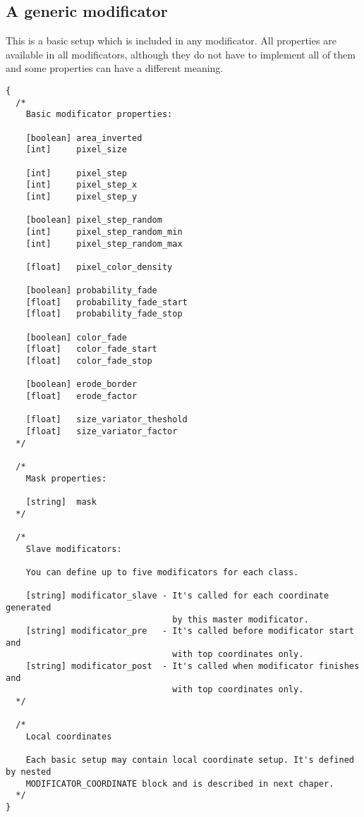 \documentclass[9pt]{article}
\begin{document}
\subsection{A generic modificator}

This is a basic setup which is included in any modificator.
All properties are available in all modificators, 
although they do not have to implement all of them 
and some properties can have a different meaning.

\begin{verbatim}
{
  /*
    Basic modificator properties:
  
    [boolean] area_inverted
    [int]     pixel_size
    
    [int]     pixel_step
    [int]     pixel_step_x
    [int]     pixel_step_y
  
    [boolean] pixel_step_random
    [int]     pixel_step_random_min
    [int]     pixel_step_random_max
    
    [float]   pixel_color_density
    
    [boolean] probability_fade
    [float]   probability_fade_start
    [float]   probability_fade_stop
  
    [boolean] color_fade
    [float]   color_fade_start
    [float]   color_fade_stop
      
    [boolean] erode_border
    [float]   erode_factor
    
    [float]   size_variator_theshold
    [float]   size_variator_factor
  */    
    
  /*
    Mask properties:
    
    [string]  mask
  */
    
  /*
    Slave modificators:
    
    You can define up to five modificators for each class.
    
    [string] modificator_slave - It's called for each coordinate generated
                                 by this master modificator.    
    [string] modificator_pre   - It's called before modificator start and
                                 with top coordinates only.
    [string] modificator_post  - It's called when modificator finishes and
                                 with top coordinates only.
  */  

  /*
    Local coordinates
    
    Each basic setup may contain local coordinate setup. It's defined by nested 
    MODIFICATOR_COORDINATE block and is described in next chaper.
  */
}
\end{verbatim}
\end{document}
